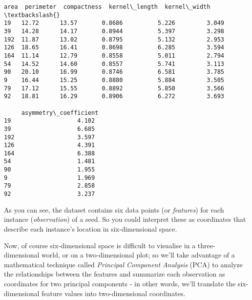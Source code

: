 \documentclass[11pt]{article}
\makeatletter
\newcommand{\boxspacing}{\kern\kvtcb@left@rule\kern\kvtcb@boxsep}
\newcommand{\prompt}[4]{
        {\ttfamily\llap{{\color{#2}[#3]:\hspace{3pt}#4}}\vspace{-\baselineskip}}
    }
\makeatother
\begin{document}
            \begin{tcolorbox}[breakable, size=fbox, boxrule=.5pt, pad at break*=1mm, opacityfill=0]
\prompt{Out}{outcolor}{1}{\boxspacing}
\begin{Verbatim}[commandchars=\\\{\}]
      area  perimeter  compactness  kernel\_length  kernel\_width  \textbackslash{}
19   12.72      13.57       0.8686          5.226         3.049
39   14.28      14.17       0.8944          5.397         3.298
192  11.87      13.02       0.8795          5.132         2.953
126  18.65      16.41       0.8698          6.285         3.594
164  11.14      12.79       0.8558          5.011         2.794
54   14.52      14.60       0.8557          5.741         3.113
90   20.10      16.99       0.8746          6.581         3.785
9    16.44      15.25       0.8880          5.884         3.505
79   17.12      15.55       0.8892          5.850         3.566
92   18.81      16.29       0.8906          6.272         3.693

     asymmetry\_coefficient
19                   4.102
39                   6.685
192                  3.597
126                  4.391
164                  6.388
54                   1.481
90                   1.955
9                    1.969
79                   2.858
92                   3.237
\end{Verbatim}
\end{tcolorbox}
        
    As you can see, the dataset contains six data points (or
\emph{features}) for each instance (\emph{observation}) of a seed. So
you could interpret these as coordinates that describe each instance's
location in six-dimensional space.

Now, of course six-dimensional space is difficult to visualise in a
three-dimensional world, or on a two-dimensional plot; so we'll take
advantage of a mathematical technique called \emph{Principal Component
Analysis} (PCA) to analyze the relationships between the features and
summarize each observation as coordinates for two principal components -
in other words, we'll translate the six-dimensional feature values into
two-dimensional coordinates.
\end{document}
